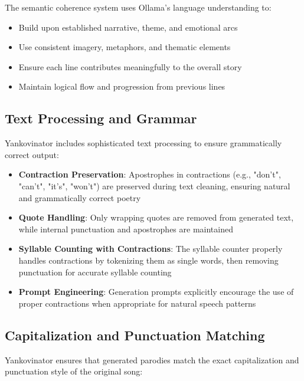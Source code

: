 \documentclass[11pt,a4paper]{article}
\begin{document}
The semantic coherence system uses Ollama's language understanding to:
\begin{itemize}
    \item Build upon established narrative, theme, and emotional arcs
    \item Use consistent imagery, metaphors, and thematic elements
    \item Ensure each line contributes meaningfully to the overall story
    \item Maintain logical flow and progression from previous lines
\end{itemize}

\subsection{Text Processing and Grammar}

Yankovinator includes sophisticated text processing to ensure grammatically correct output:

\begin{itemize}
    \item \textbf{Contraction Preservation}: Apostrophes in contractions (e.g., "don't", "can't", "it's", "won't") are preserved during text cleaning, ensuring natural and grammatically correct poetry
    \item \textbf{Quote Handling}: Only wrapping quotes are removed from generated text, while internal punctuation and apostrophes are maintained
    \item \textbf{Syllable Counting with Contractions}: The syllable counter properly handles contractions by tokenizing them as single words, then removing punctuation for accurate syllable counting
    \item \textbf{Prompt Engineering}: Generation prompts explicitly encourage the use of proper contractions when appropriate for natural speech patterns
\end{itemize}

\subsection{Capitalization and Punctuation Matching}

Yankovinator ensures that generated parodies match the exact capitalization and punctuation style of the original song:
\end{document}

